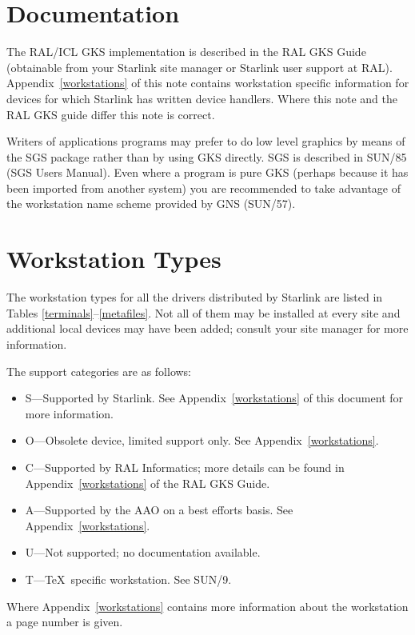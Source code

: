 \section{Documentation}
The RAL/ICL GKS implementation is described in the RAL GKS Guide (obtainable
from your Starlink site manager or Starlink user support at RAL).
Appendix~\ref{workstations} of this note contains workstation specific 
information for devices
for which Starlink has written device handlers.
Where this note and the RAL GKS guide differ this note is correct.

Writers of applications programs may prefer to do low level graphics by means
of the SGS package rather than by using GKS directly.
SGS is described in SUN/85 (SGS Users Manual).
Even where a program is pure GKS (perhaps because it has been imported from
another system) you are recommended to take advantage of the workstation name
scheme provided by GNS (SUN/57).

\section{Workstation Types}                        
The workstation types for all the drivers distributed by Starlink are 
listed in Tables \ref{terminals}--\ref{metafiles}.
Not all of them may be installed at every site and additional local devices may
have been added; consult your site manager for more information.

The support categories are as follows:
\begin{itemize}
\item S---Supported by Starlink. See Appendix~\ref{workstations} of 
this document for more
information.
\item O---Obsolete device, limited support only. See 
Appendix~\ref{workstations}.
\item C---Supported by RAL Informatics; more details can be found in 
Appendix~\ref{workstations}
of the RAL GKS Guide. 
\item A---Supported by the AAO on a best efforts basis. See 
Appendix~\ref{workstations}.
\item U---Not supported; no documentation available.
\item T---\TeX\ specific workstation. See SUN/9.
\end{itemize}

Where Appendix~\ref{workstations} contains more information about the 
workstation a page
number is given.


